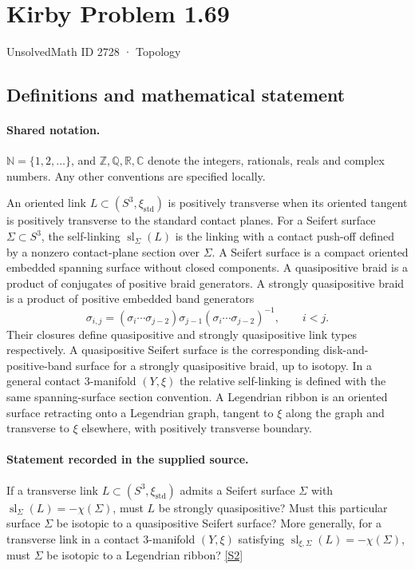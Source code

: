 \documentclass[11pt]{article}
\newcommand{\sref}[2]{\hyperlink{source:#1:#2}{[S#2]}}
\begin{document}
\setcounter{section}{2727}
\section{Kirby Problem 1.69}\label{2728}
{\small\sffamily UnsolvedMath ID 2728 · Topology}
\subsection{Definitions and mathematical statement}

\paragraph{Shared notation.}$\mathbb N=\{1,2,\ldots\}$, and $\mathbb Z,\mathbb Q,\mathbb R,\mathbb C$ denote the integers, rationals, reals and complex numbers. Any other conventions are specified locally.


An oriented link $L\subset(S^3,\xi_{\mathrm{std}})$ is positively transverse when its oriented tangent is positively transverse to the standard contact planes. For a Seifert surface $\Sigma\subset S^3$, the self-linking $\operatorname{sl}_\Sigma(L)$ is the linking with a contact push-off defined by a nonzero contact-plane section over $\Sigma$. A Seifert surface is a compact oriented embedded spanning surface without closed components. A quasipositive braid is a product of conjugates of positive braid generators. A strongly quasipositive braid is a product of positive embedded band generators
\[\sigma_{i,j}=(\sigma_i\cdots\sigma_{j-2})\sigma_{j-1}(\sigma_i\cdots\sigma_{j-2})^{-1},\qquad i<j.\]
Their closures define quasipositive and strongly quasipositive link types respectively. A quasipositive Seifert surface is the corresponding disk-and-positive-band surface for a strongly quasipositive braid, up to isotopy. In a general contact 3-manifold $(Y,\xi)$ the relative self-linking is defined with the same spanning-surface section convention. A Legendrian ribbon is an oriented surface retracting onto a Legendrian graph, tangent to $\xi$ along the graph and transverse to $\xi$ elsewhere, with positively transverse boundary.
\paragraph{Statement recorded in the supplied source.}
If a transverse link $L\subset(S^3,\xi_{\mathrm{std}})$ admits a Seifert surface $\Sigma$ with $\operatorname{sl}_\Sigma(L)=-\chi(\Sigma)$, must $L$ be strongly quasipositive? Must this particular surface $\Sigma$ be isotopic to a quasipositive Seifert surface? More generally, for a transverse link in a contact 3-manifold $(Y,\xi)$ satisfying $\operatorname{sl}_{\xi,\Sigma}(L)=-\chi(\Sigma)$, must $\Sigma$ be isotopic to a Legendrian ribbon? \sref{2728}{2}
\end{document}
